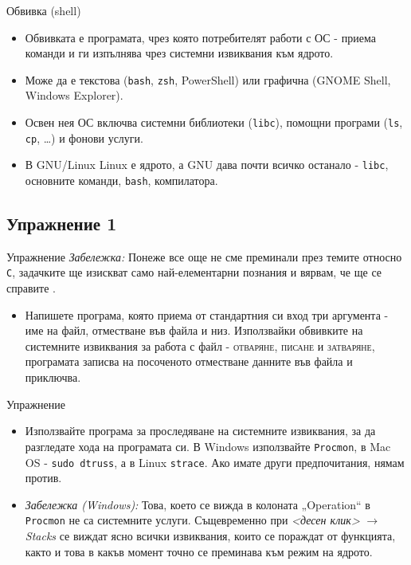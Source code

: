 \documentclass[14pt, aspectratio=169]{beamer}
\begin{document}
\begin{frame}{Обвивка (shell)}
  \begin{itemize}
    \item Обвивката е програмата, чрез която потребителят работи с ОС - приема
      команди и ги изпълнява чрез системни извиквания към ядрото.
    \item Може да е текстова (\texttt{bash}, \texttt{zsh}, PowerShell) или
      графична (GNOME Shell, Windows Explorer).
    \item Освен нея ОС включва системни библиотеки (\texttt{libc}), помощни
      програми (\texttt{ls}, \texttt{cp}, \dots) и фонови услуги.
    \item В GNU/Linux Linux е ядрото, а GNU дава почти всичко останало -
      \texttt{libc}, основните команди, \texttt{bash}, компилатора.
  \end{itemize}
\end{frame}

\subsection{Упражнение 1}

\begin{frame}{Упражнение}
  \emph{Забележка:} Понеже все още не сме преминали през темите относно
  \texttt{C}, задачките ще изискват само най-елементарни познания и вярвам, че
  ще се справите \smiley.
  \begin{itemize}
    \item Напишете програма, която приема от стандартния си вход три аргумента
      - име на файл, отместване във файла и низ. Използвайки обвивките на
      системните извиквания за работа с файл - {\rmfamily\textsc{отваряне}},
      {\rmfamily\textsc{писане}} и {\rmfamily\textsc{затваряне}}, програмата
      записва на посоченото отместване данните във файла и приключва.
  \end{itemize}
\end{frame}

\begin{frame}{Упражнение}
  \begin{itemize}
    \item Използвайте програма за проследяване на системните извиквания, за да
      разгледате хода на програмата си. В Windows използвайте
      \texttt{Procmon}, в Mac OS - \texttt{sudo dtruss}, а в Linux
      \texttt{strace}. Ако имате други предпочитания, нямам против.
    \item \emph{Забележка (Windows):} Това, което се вижда в колоната
      „Operation“ в \texttt{Procmon} не са системните услуги. Същевременно при
      \emph{\textless десен клик\textgreater} $\rightarrow$ \emph{Stacks} се виждат ясно всички
      извиквания, които се пораждат от функцията, както и това в какъв момент
      точно се преминава към режим на ядрото.
  \end{itemize}
\end{frame}
\end{document}
